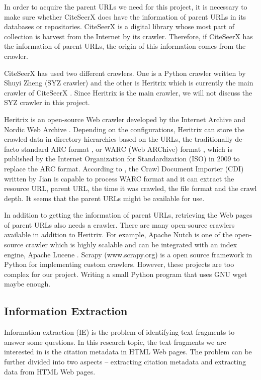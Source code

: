 \documentclass[prodmode]{acmsmall} %
\begin{document}
In order to acquire the parent URLs we need for this project, it is necessary to make sure whether CiteSeerX does have the information of parent URLs in its databases or repositories. CiteSeerX is a digital library whose most part of collection is harvest from the Internet by its crawler. Therefore, if CiteSeerX has the information of parent URLs, the origin of this information comes from the crawler.

CiteSeerX has used two different crawlers. One is a Python crawler written by Shuyi Zheng (SYZ crawler) and the other is Heritrix which is currently the main crawler of CiteSeerX \cite{wu2012web}. Since Heritrix is the main crawler, we will not discuss the SYZ crawler in this project.

Heritrix is an open-source Web crawler developed by the Internet Archive and Nordic Web Archive \cite{mohr2004introduction}. Depending on the configurations, Heritrix can store the crawled data in directory hierarchies based on the URLs, the traditionally de-facto standard ARC format \cite{burner1996archive}, or WARC (Web ARChive) format \cite{iso200928500}, which is published by the Internet Organization for Standardization (ISO) in 2009 to replace the ARC format. According to \cite{wu2012web}, the Crawl Document Importer (CDI) written by Jian is capable to process WARC format and it can extract the resource URL, parent URL, the time it was crawled, the file format and the crawl depth. It seems that the parent URLs might be available for use.

In addition to getting the information of parent URLs, retrieving the Web pages of parent URLs also needs a crawler. There are many open-source crawlers available in addition to Heritrix. For example, Apache Nutch is one of the open-source crawler  which is highly scalable and can be integrated with an index engine, Apache Lucene \cite{khare2004nutch}. Scrapy (www.scrapy.org) is a open source framework in Python for implementing custom crawlers. However, these projects are too complex for our project. Writing a small Python program that uses GNU wget \cite{niksic1998gnu} maybe enough.

\subsection{Information Extraction}

Information extraction (IE) is the problem of identifying text fragments to answer some questions. In this research topic, the text fragments we are interested in is the citation metadata in HTML Web pages. The problem can be further divided into two aspects -- extracting citation metadata and extracting data from HTML Web pages.
\end{document}
